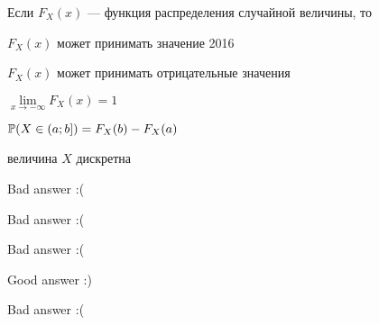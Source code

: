 
\begin{question}
Если \(F_X(x)\) — функция распределения случайной величины, то
\begin{answerlist}
  \item \(F_X(x)\) может принимать значение 2016
  \item \(F_X(x)\) может принимать отрицательные значения
  \item \(\lim\limits_{x \rightarrow -\infty} F_X(x) = 1\)
  \item \(\P(X \in (a;b]) = F_X(b) - F_X(a)\)
  \item величина \(X\) дискретна
\end{answerlist}
\end{question}

\begin{solution}
\begin{answerlist}
  \item Bad answer :(
  \item Bad answer :(
  \item Bad answer :(
  \item Good answer :)
  \item Bad answer :(
\end{answerlist}
\end{solution}

